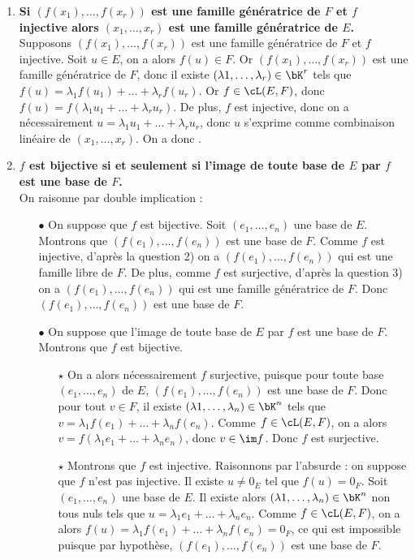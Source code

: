\documentclass[a4paper, 11pt,reqno]{article}
\begin{document}
\begin{correction}
\begin{enumerate}
		\item \textbf{Si $\left( f(x_1),\dots, f(x_r)   \right)$ est une famille g\'en\'eratrice de $F$ et $f$ injective alors $(x_1,\dots, x_r)$ est une famille g\'en\'eratrice de $E$.}\\
		      Supposons  $\left( f(x_1),\dots, f(x_r)   \right)$ est une famille g\'en\'eratrice de $F$ et $f$ injective. Soit $u \in E$, on a alors $f(u) \in F$. Or  $\left( f(x_1),\dots, f(x_r)   \right)$ est une famille g\'en\'eratrice de $F$, donc il existe $(\lambda1, \ldots, \lambda_r) \in \bK^r$ tels que $f(u) = \lambda_1 f(u_1) + \ldots + \lambda_r f(u_r)$. Or $f \in \cL(E,F)$, donc $f(u) = f(\lambda_1 u_1+ \ldots +\lambda_r u_r)$. De plus, $f$ est injective, donc on a n\'ecessairement $u=\lambda_1 u_1+ \ldots +\lambda_r u_r$, donc $u$ s'exprime comme combinaison lin\'eaire de $(x_1,\dots, x_r)$. On a donc .
		\item \textbf{$f$ est bijective si et seulement si l'image de toute base de $E$ par $f$ est une base de $F$.}\\
		      On raisonne par double implication :
		      \begin{itemize}
			      \item[$\bullet$] On suppose que $f$ est bijective. Soit $(e_1,\ldots, e_n)$ une base de $E$. Montrons que $(f(e_1), \ldots, f(e_n))$ est une base de $F$. Comme $f$ est injective, d'apr\`es la question 2) on a $(f(e_1), \ldots, f(e_n))$ qui est une famille libre de $F$. De plus, comme $f$ est surjective, d'apr\`es la question 3) on a $(f(e_1), \ldots, f(e_n))$ qui est une famille g\'en\'eratrice de $F$. Donc $(f(e_1), \ldots, f(e_n))$ est une base de $F$.
			      \item[$\bullet$] On suppose que l'image de toute base de $E$ par $f$ est une base de $F$. Montrons que $f$ est bijective.
			            \begin{itemize}
				            \item[$\star$] On a alors n\'ecessairement $f$ surjective, puisque pour toute base $(e_1,\ldots, e_n)$  de $E$, $(f(e_1), \ldots, f(e_n))$ est une base de $F$. Donc pour tout $v \in F$, il existe $(\lambda1, \ldots, \lambda_n) \in \bK^n$ tels que $v=\lambda_1 f(e_1)+ \ldots +\lambda_n f(e_n)$. Comme $f \in \cL(E,F)$, on a alors $v = f\left(\lambda_1 e_1+ \ldots +\lambda_n e_n\right)$, donc $v \in \im f$. Donc $f$ est surjective.
				            \item[$\star$] Montrons que $f$ est injective. Raisonnons par l'absurde : on suppose que $f$ n'est pas injective. Il existe $u \not = 0_E$ tel que $f(u) = 0_F$. Soit  $(e_1,\ldots, e_n)$ une base de $E$. Il existe alors $(\lambda1, \ldots, \lambda_n) \in \bK^n$ non tous nuls tels que $u=\lambda_1 e_1+ \ldots +\lambda_n e_n$. Comme $f \in \cL(E,F)$, on a alors $f(u) = \lambda_1 f(e_1)+ \ldots +\lambda_n f(e_n)=0_F$, ce qui est impossible puisque par hypoth\`ese, $(f(e_1), \ldots, f(e_n))$ est une base de $F$.

\end{itemize}
\end{itemize}
\end{enumerate}
\end{correction}
\end{document}
